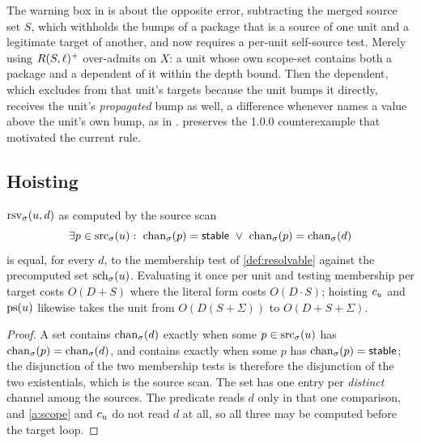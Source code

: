 \begin{remark}
\label{rem:bucket}
The warning box in  is about the opposite error, subtracting the
merged source set $S$, which withholds the bumps of a package that is a source
of one unit and a legitimate target of another, and now requires a per-unit self-source test. Merely using $R(S,\ell)^{+}$ over-admits on $X$: a unit whose own scope-set
contains both a package and a dependent of it within the depth bound. Then the
dependent, which  excludes from that unit's targets because the unit
bumps it directly, receives the unit's \emph{propagated} bump as well, a
difference whenever  names a value above the unit's own bump,
as in .  preserves the 1.0.0 counterexample that motivated the current rule.
\end{remark}

\subsection{Hoisting}

\begin{proposition}
\label{prop:hoist}
$\mathrm{rsv}_{\sigma}(u,d)$ as computed by the source scan
\[
  \exists p \in \srcp{\st}{u}:\ \chanres{\st}{p} = \stable \ \lor\
  \chanres{\st}{p} = \chanres{\st}{d}
\]
is equal, for every $d$, to the membership test of \cref{def:resolvable}
against the precomputed set $\mathrm{sch}_{\sigma}(u)$. Evaluating it once per unit and
testing membership per target costs $O(D + S)$ where the literal form costs
$O(D \cdot S)$; hoisting $c_{u}$ and $\mathrm{ps}(u)$ likewise takes the unit
from $O(D(S+\Sigma))$ to $O(D + S + \Sigma)$.
\end{proposition}

\begin{proof}
A set contains $\mathrm{chan}_{\sigma}(d)$ exactly when some $p \in \mathrm{src}_{\sigma}(u)$ has
$\mathrm{chan}_{\sigma}(p) = \mathrm{chan}_{\sigma}(d)$, and contains \stable{} exactly when some
$p$ has $\mathrm{chan}_{\sigma}(p) = \mathsf{stable}$; the disjunction of the two membership
tests is therefore the disjunction of the two existentials, which is the source
scan. The set has one entry per \emph{distinct} channel among the sources.
The predicate reads $d$ only in that one comparison, and \cref{a:scope}
and $c_{u}$ do not read $d$ at all, so all three may be computed before the
target loop.
\end{proof}

